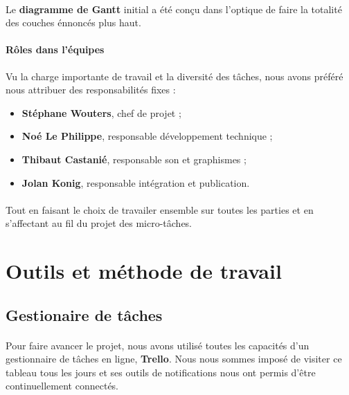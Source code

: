 \paragraph{}
Le \textbf{diagramme de Gantt} initial a été conçu dans l’optique de faire la totalité des couches énnoncés plus haut.

\paragraph{Rôles dans l’équipes}
Vu la charge importante de travail et la diversité des tâches, nous avons préféré nous attribuer des responsabilités fixes :

\begin{itemize}
\item \textbf{Stéphane Wouters}, chef de projet ;
\item \textbf{Noé Le Philippe}, responsable développement technique ;
\item \textbf{Thibaut Castanié}, responsable son et graphismes ;
\item \textbf{Jolan Konig}, responsable intégration et publication.
\end{itemize}

\paragraph{}
Tout en faisant le choix de travailer ensemble sur toutes les parties et en s’affectant au fil du projet des micro-tâches.

\section{Outils et méthode de travail}

\subsection{Gestionaire de tâches}

\paragraph{}
Pour faire avancer le projet, nous avons utilisé toutes les capacités d’un gestionnaire de tâches en ligne, \textbf{Trello}. Nous nous sommes imposé de visiter ce tableau tous les jours et ses outils de notifications nous ont permis d’être continuellement connectés.


